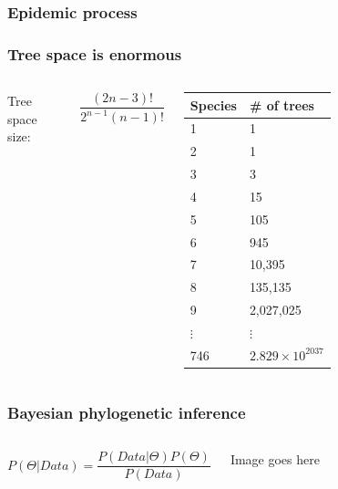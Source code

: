 \documentclass{beamer}
\newcommand{\mysymbol}[1]{\mathord{\texttt{[image: image/\#1]}}}
\begin{document}

\begin{frame}
  \frametitle{Epidemic process}
\end{frame}


\begin{frame}
  \frametitle{Tree space is enormous}
  \begin{columns}[c]

      Tree space size:

      $$
      \frac{(2n-3)!}{2^{n-1}(n-1)!}
      $$

    \begin{table}
      \begin{tabular}{l l}
      \toprule
      \textbf{Species} & \textbf{\# of trees}\\
      \midrule
      1 & 1\\
      2 & 1\\
      3 & 3\\
      4 & 15\\
      5 & 105\\
      6 & 945\\
      7 & 10,395\\
      8 & 135,135\\
      9 & 2,027,025\\
      $\vdots$ & $\vdots$\\
      746 & $2.829\times10^{2037}$\\
      \bottomrule
      \end{tabular}
    \end{table}
  \end{columns}
\end{frame}


\begin{frame}
  \frametitle{Bayesian phylogenetic inference}
  \begin{columns}[c]

      $$
      P(\Theta \vert Data) = \frac{P(Data \vert \Theta)P(\Theta)}{P(Data)}
      $$


      Image goes here

  \end{columns}
\end{frame}
\end{document}
